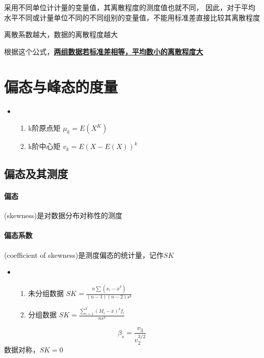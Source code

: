 \documentclass[UTF8,10pt]{book}
\begin{document}
                {\kaishu 采用不同单位计计量的变量值，其离散程度的测度值也就不同，
                因此，对于平均水平不同或计量单位不同的不同组别的变量值，不能用标准差直接比较其离散程度}

                {\kaishu 离散系数越大，数据的离散程度越大}

                {\kaishu 根据这个公式，\textbf{\underline{两组数据若标准差相等，平均数小的离散程度大}}}


    \section{偏态与峰态的度量}
    		
    		\begin{itemize}
    			\item [] {
    				\begin{enumerate}
    					\item k阶原点矩 $ \mu_k = E(X^K) $
    					\item k阶中心矩 $ v_k = E(X-E(X))^k $
    				
    				\end{enumerate}
    			}
    		\end{itemize}
        \subsection{偏态及其测度}
                \paragraph{偏态} (skewness)是对数据分布对称性的测度
                
                \paragraph{偏态系数} (coefficient of skewness)是测度偏态的统计量，记作$SK$
                               
                    \begin{itemize}
                        \item [] {
                            \begin{enumerate}
                                \item 未分组数据 $ SK = \frac{n \sum (x_i-\overline{x}^3)}{(n-1)(n-2)s^3} $
                                \item 分组数据 $ SK = \frac{\sum_{i=1}^k (M_i - \overline{x})^3 f_i}{ns^3} $
                            \end{enumerate}
                        }
                    \end{itemize}
                    $$ \beta_s = \frac{v_3}{v_2^{3/2}} $$
                    {\kaishu 数据对称，$SK = 0 $ }
\end{document}
